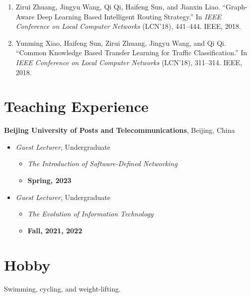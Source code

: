 \documentclass[letterpaper,11pt]{article}
\newcommand{\contentlength}{5.25in} %
\begin{document}
\begin{tcolorbox}[flush right,breakable,colback=white,colframe=white,width=\contentlength]
\begin{enumerate}[itemsep=0mm]
			\item Zirui Zhuang, Jingyu Wang, Qi Qi, Haifeng Sun, and Jianxin Liao. “Graph-Aware Deep Learning Based Intelligent Routing Strategy.” In \textit{IEEE Conference on Local Computer Networks} (LCN'18), 441–444. IEEE, 2018.
			\item Yunming Xiao, Haifeng Sun, Zirui Zhuang, Jingyu Wang, and Qi Qi. “Common Knowledge Based Transfer Learning for Traffic Classification.” In \textit{IEEE Conference on Local Computer Networks} (LCN'18), 311–314. IEEE, 2018.
		\end{enumerate}
		
	\end{tcolorbox}

	
	
	
	
	\section{\textbf{Teaching Experience}}
	\begin{tcolorbox}[flush right,breakable,colback=white,colframe=white,width=\contentlength]
		\textbf{Beijing University of Posts and Telecommunications}, Beijing, China
		\begin{itemize}[itemsep=0mm]
			\item \textit{Guest Lecturer}, Undergraduate 
			\begin{itemize}[itemsep=0mm]
				\item \textit{The Introduction of Software-Defined Networking}
				\item  \textbf{Spring, 2023}
			\end{itemize}
	
			\item \textit{Guest Lecturer}, Undergraduate 
			\begin{itemize}[itemsep=0mm]
				\item \textit{The Evolution of Information Technology}	
				\item \textbf{Fall, 2021, 2022}
			\end{itemize}
		\end{itemize}
	\end{tcolorbox}
	
	
	
	\section{\textbf{Hobby}}
	\begin{tcolorbox}[flush right,breakable,colback=white,colframe=white,width=\contentlength]
		Swimming, cycling, and weight-lifting.
		
	\end{tcolorbox}
	
	
	
\end{document}
